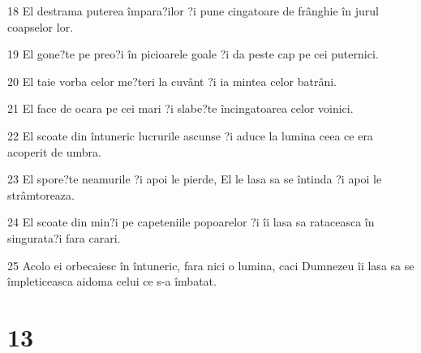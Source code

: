 \par 18 El destrama puterea împara?ilor ?i pune cingatoare de frânghie în jurul coapselor lor.
\par 19 El gone?te pe preo?i în picioarele goale ?i da peste cap pe cei puternici.
\par 20 El taie vorba celor me?teri la cuvânt ?i ia mintea celor batrâni.
\par 21 El face de ocara pe cei mari ?i slabe?te încingatoarea celor voinici.
\par 22 El scoate din întuneric lucrurile ascunse ?i aduce la lumina ceea ce era acoperit de umbra.
\par 23 El spore?te neamurile ?i apoi le pierde, El le lasa sa se întinda ?i apoi le strâmtoreaza.
\par 24 El scoate din min?i pe capeteniile popoarelor ?i îi lasa sa rataceasca în singurata?i fara carari.
\par 25 Acolo ei orbecaiesc în întuneric, fara nici o lumina, caci Dumnezeu îi lasa sa se împleticeasca aidoma celui ce s-a îmbatat.

\chapter{13}

